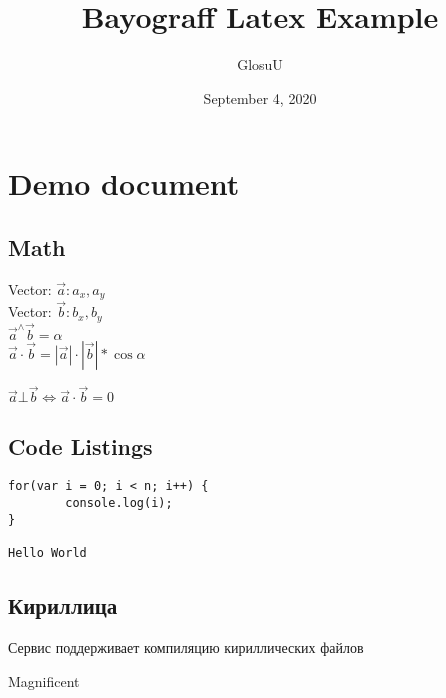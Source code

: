\documentclass[12pt, a4paper]{article}
\author{GlosuU}
\title{Bayograff Latex Example}
\date{September 4, 2020}
\begin{document}
\maketitle
\tableofcontents
\section{Demo document}
\subsection{Math}

Vector: $\vec{a}: a_x, a_y$ \\
Vector: $\vec{b}: b_x, b_y$ \\
$\vec{a} ^\wedge \vec{b} = \alpha$ \\
$\vec{a} \cdot \vec{b} = |\vec{a}| \cdot |\vec{b}| * \cos \alpha$

$\vec{a} \bot \vec{b} \Leftrightarrow \vec{a} \cdot \vec{b} = 0$

\subsection{Code Listings}
\begin{lstlisting}
for(var i = 0; i < n; i++) {
        console.log(i);
}

Hello World
\end{lstlisting}

\subsection{Кириллица}
Сервис поддерживает компиляцию кириллических файлов

Magnificent
\end{document}
